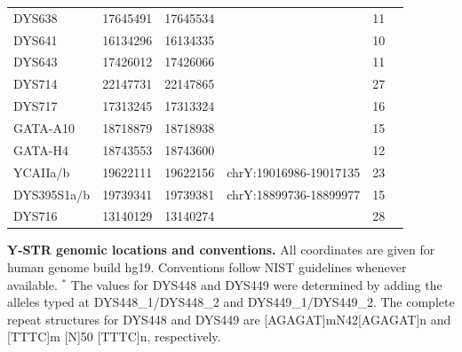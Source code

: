 \begin{tabularx}{\linewidth}{l l l l l l }
DYS638      & 17645491 & 17645534 &                        & 11 \\
DYS641      & 16134296 & 16134335 &                        & 10 \\
DYS643      & 17426012 & 17426066 &                        & 11 \\
DYS714      & 22147731 & 22147865 &                        & 27 \\
DYS717      & 17313245 & 17313324 &                        & 16 \\
GATA-A10    & 18718879 & 18718938 &                        & 15 \\
GATA-H4     & 18743553 & 18743600 &                        & 12 \\
YCAIIa/b    & 19622111 & 19622156 & chrY:19016986-19017135 & 23 \\
DYS395S1a/b & 19739341 & 19739381 & chrY:18899736-18899977 & 15 \\
DYS716      & 13140129 & 13140274 &                        & 28 \\
\hline
\end{tabularx}
\textbf{Y-STR genomic locations and conventions.} All coordinates are given for human genome build hg19. Conventions follow NIST guidelines whenever available. $^*$ The values for DYS448 and DYS449 were determined by adding the alleles typed at DYS448\_1/DYS448\_2 and DYS449\_1/DYS449\_2. The complete repeat structures for DYS448 and DYS449 are  [AGAGAT]mN42[AGAGAT]n and [TTTC]m [N]50 [TTTC]n, respectively.

\pagebreak
